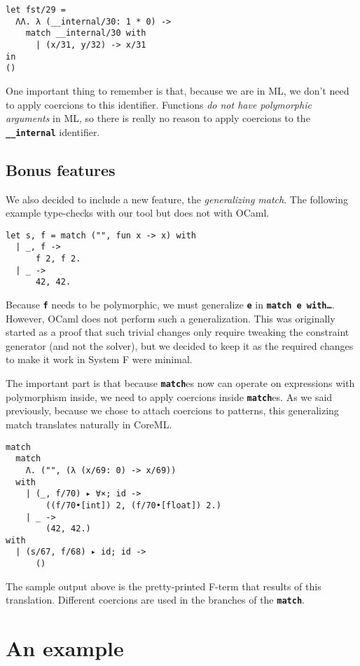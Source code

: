 \documentclass[10pt,a4paper,twoside,titlepage,twocolumn]{article}
\newcommand{\code}[1]{\textbf{\texttt{#1}}}
\begin{document}
\begin{verbatim}
let fst/29 =
  ΛΛ. λ (__internal/30: 1 * 0) -> 
    match __internal/30 with
      | (x/31, y/32) -> x/31
in
()
\end{verbatim}

One important thing to remember is that, because we are in ML, we don't need to
apply coercions to this identifier. Functions \emph{do not have polymorphic
arguments} in ML, so there is really no reason to apply coercions to the
\code{\_\_internal} identifier.

\subsection{Bonus features}

We also decided to include a new feature, the \emph{generalizing match}. The
following example type-checks with our tool but does not with OCaml.

\begin{verbatim}
let s, f = match ("", fun x -> x) with
  | _, f ->
      f 2, f 2.
  | _ ->
      42, 42.
\end{verbatim}

Because \code{f} needs to be polymorphic, we must generalize \code{e} in
\code{match e with\dots}. However, OCaml does not perform such a generalization.
This was originally started as a proof that such trivial changes only require
tweaking the constraint generator (and not the solver), but we decided to keep
it as the required changes to make it work in System F were minimal.

The important part is that because \code{match}es now can operate on
expressions with polymorphism inside, we need to apply coercions inside
\code{match}es. As we said previously, because we chose to attach coercions to
patterns, this generalizing match translates naturally in CoreML.

\begin{verbatim}
match
  match
    Λ. ("", (λ (x/69: 0) -> x/69))
  with
    | (_, f/70) ▸ ∀×; id ->
        ((f/70•[int]) 2, (f/70•[float]) 2.)
    | _ ->
        (42, 42.)
with
  | (s/67, f/68) ▸ id; id ->
      ()
\end{verbatim}

The sample output above is the pretty-printed F-term that results of this
translation. Different coercions are used in the branches of the \code{match}.

\section{An example}
\end{document}
